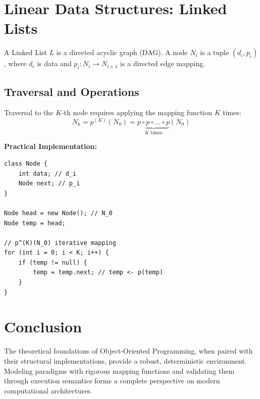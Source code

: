 \documentclass[10pt,journal,compsoc]{IEEEtran}
\begin{document}
\section{Linear Data Structures: Linked Lists}
A Linked List $L$ is a directed acyclic graph (DAG). A node $N_i$ is a tuple $(d_i, p_i)$, where $d_i$ is data and $p_i : N_i \to N_{i+1}$ is a directed edge mapping.

\subsection{Traversal and Operations}
Traversal to the $K$-th node requires applying the mapping function $K$ times:
\[ N_k = p^{(K)}(N_0) = \underbrace{p \circ p \circ \dots \circ p}_{K \text{ times}}(N_0) \]

\textbf{Practical Implementation:}
\begin{verbatim}
class Node {
    int data; // d_i
    Node next; // p_i
}

Node head = new Node(); // N_0
Node temp = head;

// p^(K)(N_0) iterative mapping
for (int i = 0; i < K; i++) {
    if (temp != null) {
        temp = temp.next; // temp <- p(temp)
    }
}
\end{verbatim}

\section{Conclusion}
The theoretical foundations of Object-Oriented Programming, when paired with their structural implementations, provide a robust, deterministic environment. Modeling paradigms with rigorous mapping functions and validating them through execution semantics forms a complete perspective on modern computational architectures.
\end{document}
